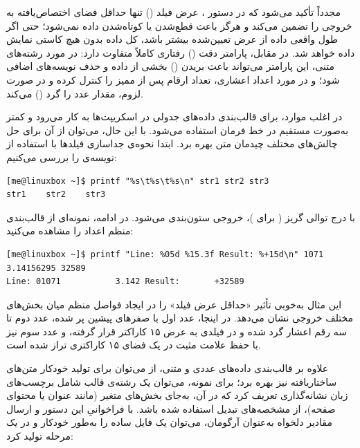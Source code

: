 مجدداً تأکید می‌شود که در دستور ، عرض فیلد () تنها حداقل فضای اختصاص‌یافته به خروجی را تضمین می‌کند و هرگز باعث قطع‌شدن یا کوتاه‌شدن داده نمی‌شود؛ حتی اگر طول واقعی داده از عرض تعیین‌شده بیشتر باشد، کل داده بدون هیچ کاستی نمایش داده خواهد شد. در مقابل، پارامتر دقت () رفتاری کاملاً متفاوت دارد: در مورد رشته‌های متنی، این پارامتر می‌تواند باعث بریدن () بخشی از داده و حذف نویسه‌های اضافی شود؛ و در مورد اعداد اعشاری، تعداد ارقام پس از ممیز را کنترل کرده و در صورت لزوم، مقدار عدد را گرد () می‌کند.

در اغلب موارد،  برای قالب‌بندی داده‌های جدولی در اسکریپت‌ها به کار می‌رود و کمتر به‌صورت مستقیم در خط فرمان استفاده می‌شود. با این حال، می‌توان از آن برای حل چالش‌های مختلف چیدمان متن بهره برد. ابتدا نحوه‌ی جداسازی فیلدها با استفاده از نویسه‌ی  را بررسی می‌کنیم:

\begin{latin}
\begin{lstlisting}
[me@linuxbox ~]$ printf "%s\t%s\t%s\n" str1 str2 str3
str1	str2	str3
\end{lstlisting}
\end{latin}

با درج توالی گریز  ( برای )، خروجی ستون‌بندی می‌شود. در ادامه، نمونه‌ای از قالب‌بندی منظم اعداد را مشاهده می‌کنید:

\begin{latin}
\begin{lstlisting}
[me@linuxbox ~]$ printf "Line: %05d %15.3f Result: %+15d\n" 1071 3.14156295 32589
Line: 01071           3.142 Result:       +32589
\end{lstlisting}
\end{latin}

این مثال به‌خوبی تأثیر «حداقل عرض فیلد» را در ایجاد فواصل منظم میان بخش‌های مختلف خروجی نشان می‌دهد. در اینجا، عدد اول با صفرهای پیشین پر شده، عدد دوم تا سه رقم اعشار گرد شده و در فیلدی به عرض ۱۵ کاراکتر قرار گرفته، و عدد سوم نیز با حفظ علامت مثبت در یک فضای ۱۵ کاراکتری تراز شده است.

علاوه بر قالب‌بندی داده‌های عددی و متنی، از  می‌توان برای تولید خودکار متن‌های ساختاریافته نیز بهره برد؛ برای نمونه، می‌توان یک رشته‌ی قالب شامل برچسب‌های زبان نشانه‌گذاری  تعریف کرد که در آن، به‌جای بخش‌های متغیر (مانند عنوان یا محتوای صفحه)، از مشخصه‌های تبدیل  استفاده شده باشد. با فراخوانیِ این دستور و ارسال مقادیر دلخواه به‌عنوان آرگومان، می‌توان یک فایل  ساده را به‌طور خودکار و در یک مرحله تولید کرد:

